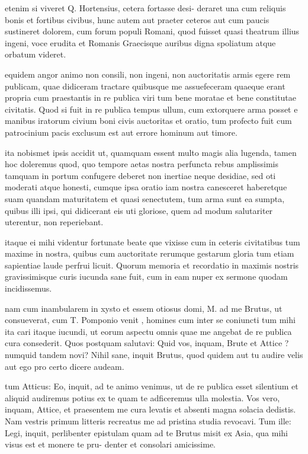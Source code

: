 etenim si viveret Q. Hortensius, cetera fortasse desi- deraret una cum reliquis bonis et fortibus civibus, hunc autem aut praeter ceteros aut cum paucis sustineret dolorem, cum forum populi Romani, quod fuisset quasi theatrum illius ingeni, voce erudita et Romanis Graecisque auribus digna spoliatum atque orbatum videret.

 equidem angor animo non consili, non ingeni, non auctoritatis armis egere rem publicam, quae didiceram tractare quibusque me assuefeceram quaeque erant propria cum praestantis in re publica viri tum bene moratae et bene constitutae civitatis. Quod si fuit in re publica tempus ullum, cum extorquere arma posset e manibus iratorum civium boni civis auctoritas et oratio, tum profecto fuit cum patrocinium pacis exclusum est aut errore hominum aut timore.

 ita nobismet ipsis accidit ut, quamquam essent multo magis alia lugenda, tamen hoc doleremus quod, quo tempore aetas nostra perfuncta rebus amplissimis tamquam in portum confugere deberet non inertiae neque desidiae, sed oti moderati atque honesti, cumque ipsa oratio iam nostra canesceret haberetque suam quandam maturitatem et quasi senectutem, tum arma sunt ea sumpta, quibus illi ipsi, qui didicerant eis uti gloriose, quem ad modum salutariter uterentur, non reperiebant.

 itaque ei mihi videntur fortunate beate que vixisse cum in ceteris civitatibus tum maxime in nostra, quibus cum auctoritate rerumque gestarum gloria tum etiam sapientiae laude perfrui licuit. Quorum memoria et recordatio in maximis nostris gravissimisque curis iucunda sane fuit, cum in eam nuper ex sermone quodam incidissemus.

 nam cum inambularem in xysto et essem otiosus domi, M. ad me Brutus, ut consueverat, cum T. Pomponio venit , homines cum inter se coniuncti tum mihi ita cari itaque iucundi, ut eorum aspectu omnis quae me angebat de re publica cura consederit. Quos postquam salutavi: Quid vos, inquam, Brute et Attice ? numquid tandem novi? Nihil sane, inquit Brutus, quod quidem aut tu audire velis aut ego pro certo dicere audeam.

 tum Atticus: Eo, inquit, ad te animo venimus, ut de re publica esset silentium et aliquid audiremus potius ex te quam te adficeremus ulla molestia. Vos vero, inquam, Attice, et praesentem me cura levatis et absenti magna solacia dedistis. Nam vestris primum litteris recreatus me ad pristina studia revocavi. Tum ille: Legi, inquit, perlibenter epistulam quam ad te Brutus misit ex Asia, qua mihi visus est et monere te pru- denter et consolari amicissime.

